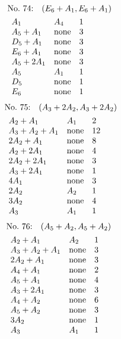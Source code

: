 %
%
\begin{align*}
&\hbox to 4cm {\textrm{No.~74:}\quad$(E_{6}+A_{1}, E_{6}+A_{1})$\hss}\\ 
&\begin{array}{lll}
A_{1} & A_{4} & 1\\
A_{5}+A_{1} & \none & 3\\
D_{5}+A_{1} & \none & 3\\
E_{6}+A_{1} & \none & 3\\
A_{5}+2A_{1} & \none & 3\\
A_{5} & A_{1} & 1\\
D_{5} & \none & 1\\
E_{6} & \none & 1\\
\end{array}
\end{align*}
%
%
\begin{align*}
&\hbox to 4cm {\textrm{No.~75:}\quad$(A_{3}+2A_{2}, A_{3}+2A_{2})$\hss}\\ 
&\begin{array}{lll}
A_{2}+A_{1} & A_{1} & 2\\
A_{3}+A_{2}+A_{1} & \none & 12\\
2A_{2}+A_{1} & \none & 8\\
A_{2}+2A_{1} & \none & 4\\
2A_{2}+2A_{1} & \none & 3\\
A_{3}+2A_{1} & \none & 1\\
4A_{1} & \none & 3\\
2A_{2} & A_{2} & 1\\
3A_{2} & \none & 4\\
A_{3} & A_{1} & 1\\
\end{array}
\end{align*}
%
%
\begin{align*}
&\hbox to 4cm {\textrm{No.~76:}\quad$(A_{5}+A_{2}, A_{5}+A_{2})$\hss}\\ 
&\begin{array}{lll}
A_{2}+A_{1} & A_{2} & 1\\
A_{3}+A_{2}+A_{1} & \none & 3\\
2A_{2}+A_{1} & \none & 3\\
A_{4}+A_{1} & \none & 2\\
A_{5}+A_{1} & \none & 4\\
A_{3}+2A_{1} & \none & 3\\
A_{4}+A_{2} & \none & 6\\
A_{5}+A_{2} & \none & 3\\
3A_{2} & \none & 1\\
A_{3} & A_{1} & 1\\
\end{array}
\end{align*}
